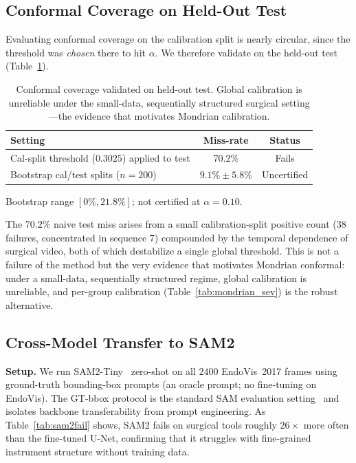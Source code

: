\documentclass[letterpaper, 10 pt, conference]{ieeeconf}  %
\newcommand{\unet}{U-Net}
\begin{document}
\subsection{Conformal Coverage on Held-Out Test}

Evaluating conformal coverage on the calibration split is nearly circular,
since the threshold was \emph{chosen} there to hit $\alpha$. We therefore
validate on the held-out test (Table~\ref{tab:heldout}).

\begin{table}[t]
\caption{Conformal coverage validated on held-out test. Global calibration is unreliable under the small-data, sequentially structured surgical setting---the evidence that motivates Mondrian calibration.}
\label{tab:heldout}
\centering
\footnotesize
\setlength{\tabcolsep}{4pt}
\begin{tabular}{p{4.4cm}cc}
\toprule
Setting & Miss-rate & Status \\
\midrule
Cal-split threshold ($0.3025$) applied to test & 70.2\% & Fails \\
Bootstrap cal/test splits ($n=200$) & $9.1\% \pm 5.8\%$ & Uncertified \\
\bottomrule
\end{tabular}
\par\vspace{2pt}
{\footnotesize Bootstrap range $[0\%, 21.8\%]$; not certified at $\alpha=0.10$.}
\end{table}

The $70.2\%$ naive test miss arises from a small calibration-split positive
count ($38$ failures, concentrated in sequence $7$) compounded by the
temporal dependence of surgical video, both of which destabilize a single
global threshold. This is not a failure of the method but the very evidence
that motivates Mondrian conformal: under a small-data, sequentially
structured regime, global calibration is unreliable, and per-group
calibration (Table~\ref{tab:mondrian_sev}) is the robust alternative.

\subsection{Cross-Model Transfer to SAM2}

\textbf{Setup.} We run SAM2-Tiny~\cite{ref:ravi} zero-shot on all $2400$
EndoVis~2017 frames using ground-truth bounding-box prompts (an oracle
prompt; no fine-tuning on EndoVis). The GT-bbox protocol is the standard SAM
evaluation setting~\cite{ref:kirillov} and isolates backbone transferability
from prompt engineering. As Table~\ref{tab:sam2fail} shows, SAM2 fails on
surgical tools roughly $26\times$ more often than the fine-tuned \unet{},
confirming that it struggles with fine-grained instrument structure without
training data.
\end{document}
